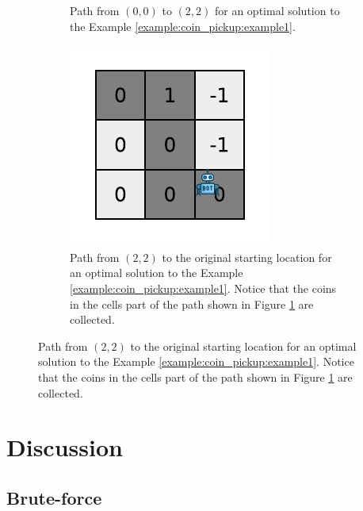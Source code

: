 \begin{figure}
\begin{subfigure}[t]{0.3\textwidth}
		\caption{Path from $(0,0)$ to $(2,2)$ for an optimal solution to the Example \ref{example:coin_pickup:example1}.}
		\label{fig:coin_pickup:example_1_1}
	 \end{subfigure}
	 \hfill
	 \begin{subfigure}[t]{0.3\textwidth}
		 \includegraphics[width=1\linewidth]{sources/coin_pickup/images/example1_2}
		 \caption{Path from $(2,2)$ to the original starting location for an optimal solution to the Example \ref{example:coin_pickup:example1}.
		 Notice that the coins in the cells part of the path shown in Figure \ref{fig:coin_pickup:example_1_1} are collected.}
		 \label{fig:coin_pickup:example_1_2}
	  \end{subfigure}
\end{figure}


\section{Discussion}
\label{coin_pickup:sec:discussion}


\subsection{Brute-force}
\label{coin_pickup:sec:bruteforce}

\begin{minipage}{\linewidth}
	
\end{minipage}



